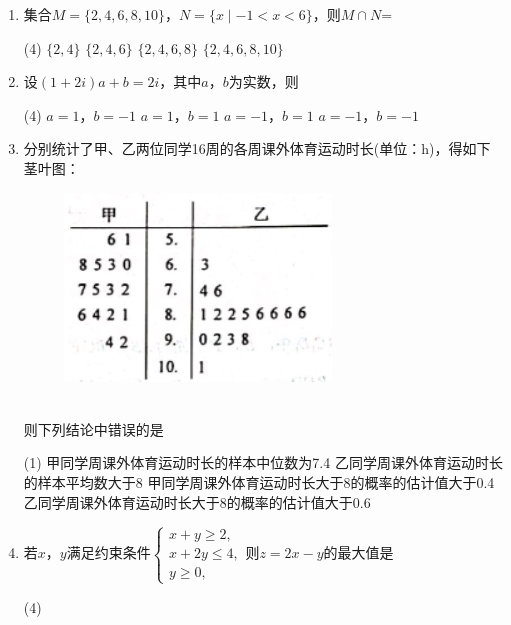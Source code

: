 \documentclass[12pt,space]{ctexart} %
\begin{document}
\begin{enumerate}[itemsep=0.2em,topsep=0pt]

  \item 集合$M=\{2,4,6,8,10\}$，$N=\{x \mid-1<x<6\}$，则$M\cap N$= 
  \begin{tasks}(4)
    \task $\{2,4\}$ \task $\{2,4,6\}$ \task $\{2,4,6,8\}$ \task $\{2,4,6,8,10\}$ 
  \end{tasks}

  \item 设$(1+2i)a+b=2i$，其中$a$，$b$为实数，则
  \begin{tasks}(4)
    \task $a=1$，$b=-1$ \task $a=1$，$b=1$ \task $a=-1$，$b=1$ \task $a=-1$，$b=-1$  
  \end{tasks}

  \item 分别统计了甲、乙两位同学16周的各周课外体育运动时长(单位：h)，得如下茎叶图：\\[-1.5em]
  \begin{figure}[htbp]
    \centering
    \includegraphics{Image/ii-w-3.png}
  \end{figure}\\[-1.5em]
  则下列结论中错误的是
  \begin{tasks}(1)
    \task 甲同学周课外体育运动时长的样本中位数为7.4
    \task 乙同学周课外体育运动时长的样本平均数大于8
    \task 甲同学周课外体育运动时长大于8的概率的估计值大于0.4
    \task 乙同学周课外体育运动时长大于8的概率的估计值大于0.6
  \end{tasks}

  \item 若$x$，$y$满足约束条件$\left\{\begin{array}{l}x+y\geqslant 2,\\x+2y\leqslant 4,\\y\geqslant 0,\end{array}\right.$则$z=2x-y$的最大值是
  \begin{tasks}(4)
       
  \end{tasks}


\end{enumerate}
\end{document}
